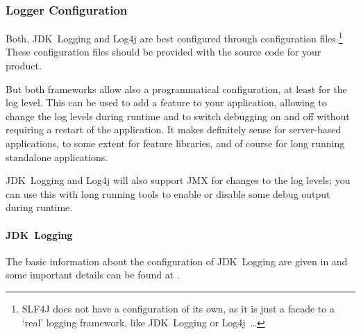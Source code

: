 \documentclass[11pt,a4paper, titlepage, parskip=half, headsepline, footsepline, cleardoublepage=current, headheight=1cm]{scrbook}
\begin{document}

\subsubsection{Logger Configuration}\label{sec:LoggerConfiguration}
Both, JDK~Logging and Log4j are best configured through configuration files.\footnote{SLF4J does not have a configuration of its own, as it is just a facade to a ‘real’ logging framework, like JDK~Logging or Log4j~…} These configuration files should be provided with the source code for your product.

But both frameworks allow also a programmatical configuration, at least for the log level. This can be used to add a feature to your application, allowing to change the log levels during runtime and to switch debugging on and off without requiring a restart of the application. It makes definitely sense for server-based applications, to some extent for feature libraries, and of course for long running standalone applications.

JDK~Logging and Log4j will also support JMX for changes to the log levels\autocite{ORACLE_DOC_LOGGINGMXBEAN_INTERFACE, APACHE_LOG4J:JMX}; you can use this with long running tools to enable or disable some debug output during runtime.


\paragraph{JDK~Logging} The basic information about the configuration of JDK~Logging are given in \autocite{ORACLE_DOC_LOGGING_OVERVIEW:ConfigurationFile, ORACLE_DOC_LOGGING_OVERVIEW:DefaultConfiguration} and some important details can be found at \autocite{ORACLE_DOC_LOGMANAGER_CLASS}.
\end{document}
